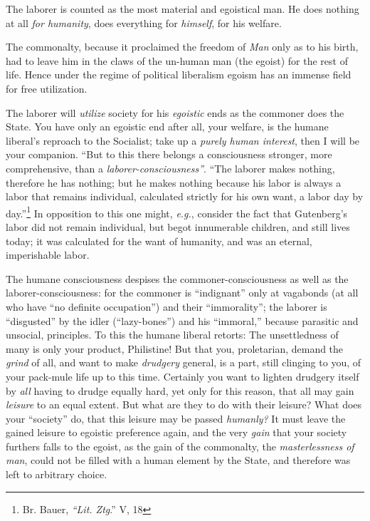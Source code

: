 The laborer is counted as the most material and egoistical man. He does 
nothing at all \textit{for humanity}, does everything for \textit{himself}, 
for his welfare.

The commonalty, because it proclaimed the freedom of \textit{Man} only as to 
his birth, had to leave him in the claws of the un-human man (the egoist) for 
the rest of life. Hence under the regime of political liberalism egoism has an 
immense field for free utilization.

The laborer will \textit{utilize} society for his \textit{egoistic} ends as 
the commoner does the State. You have only an egoistic end after all, your 
welfare, is the humane liberal's reproach to the Socialist; take up a 
\textit{purely human interest}, then I will be your companion. ``But to this 
there belongs a consciousness stronger, more comprehensive, than a 
\textit{laborer-consciousness''}. ``The laborer makes nothing, therefore he 
has nothing; but he makes nothing because his labor is always a labor that 
remains individual, calculated strictly for his own want, a labor day by 
day.''\footnote{Br. Bauer, \textit{``Lit. Ztg}.'' V, 18} In opposition to 
this one might, \textit{e.g.}, consider the fact that Gutenberg's labor did 
not remain individual, but begot innumerable children, and still lives today; 
it was calculated for the want of humanity, and was an eternal, imperishable 
labor.

The humane consciousness despises the commoner-consciousness as well as the 
laborer-consciousness: for the commoner is ``indignant'' only at vagabonds 
(at all who have ``no definite occupation'') and their ``immorality''; the 
laborer is ``disgusted'' by the idler (``lazy-bones'') and his 
``immoral,'' because parasitic and unsocial, principles. To this the humane 
liberal retorts: The unsettledness of many is only your product, Philistine! 
But that you, proletarian, demand the \textit{grind} of all, and want to make 
\textit{drudgery} general, is a part, still clinging to you, of your pack-mule 
life up to this time. Certainly you want to lighten drudgery itself by 
\textit{all} having to drudge equally hard, yet only for this reason, that all 
may gain \textit{leisure} to an equal extent. But what are they to do with 
their leisure? What does your ``society'' do, that this leisure may be 
passed \textit{humanly?} It must leave the gained leisure to egoistic 
preference again, and the very \textit{gain} that your society furthers falls 
to the egoist, as the gain of the commonalty, the \textit{masterlessness of 
man}, could not be filled with a human element by the State, and therefore was 
left to arbitrary choice.


